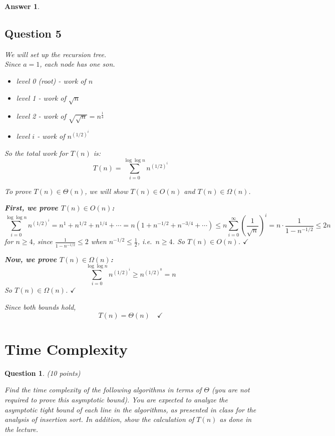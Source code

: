 \documentclass[a4paper]{article}
\theoremstyle{remarksStyle}
\theoremstyle{questionStyle}
\newtheorem{question}{Question}
\theoremstyle{answerStyle}
\newtheorem{answer}{Answer}
\begin{document}
\begin{answer}
\subsection*{Question 5}
We will set up the recursion tree.\\
Since $a = 1$, each node has one son.

\begin{itemize}
    \item level 0 (root) - work of $n$
    \item level 1 - work of $\sqrt{n}$
    \item level 2 - work of $\sqrt{\sqrt{n}} = n^{\frac{1}{4}}$
    \item level $i$ - work of $n^{(1/2)^i}$
\end{itemize}

So the total work for $T(n)$ is:
\[
T(n) = \sum_{i=0}^{\log\log n} n^{(1/2)^i}
\]

To prove $T(n) \in \Theta(n)$, we will show $T(n) \in O(n)$ and $T(n) \in \Omega(n)$.

\medskip
\noindent\textbf{First, we prove $T(n) \in O(n)$:}
\[
\sum_{i=0}^{\log\log n} n^{(1/2)^i} 
= n^1 + n^{1/2} + n^{1/4} + \cdots
= n \left(1 + n^{-1/2} + n^{-3/4} + \cdots \right)
\leq n \sum_{i=0}^{\infty} \left(\frac{1}{\sqrt{n}}\right)^i
= n \cdot \frac{1}{1 - n^{-1/2}}
\leq 2n
\]
for $n \geq 4$, since $\frac{1}{1-n^{-1/2}} \leq 2$ when $n^{-1/2} \leq \frac{1}{2}$, i.e.\ $n \geq 4$.
So $T(n) \in O(n)$. $\checkmark$

\medskip
\noindent\textbf{Now, we prove $T(n) \in \Omega(n)$:}
\[
\sum_{i=0}^{\log\log n} n^{(1/2)^i} \geq n^{(1/2)^0} = n
\]
So $T(n) \in \Omega(n)$. $\checkmark$

\noindent Since both bounds hold,\\
\[
    \boxed{T(n) = \Theta(n)} \quad \checkmark
\]
\end{answer}


\vspace{2cm}

\section{Time Complexity}
\begin{question} (10 points)
    
Find the time complexity of the following algorithms in terms of $\Theta$ (you are not required to prove this asymptotic bound).
You are expected to analyze the asymptotic tight bound of each line in the algorithms, as presented in class for the analysis of insertion sort. 
In addition, show the calculation of $T(n)$ as done in the lecture.
\end{question}
\end{document}
